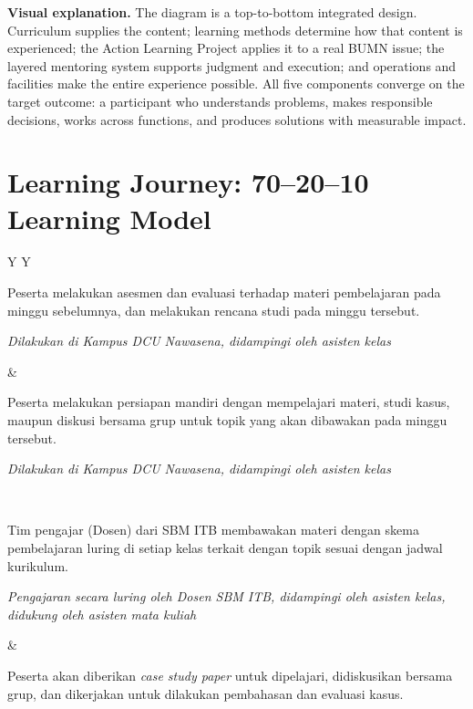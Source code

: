 \documentclass[10pt]{article}
\newcommand{\visualexplanation}[1]{%
  \begin{tcolorbox}[colback=lightgray,colframe=navy!35,boxrule=0.5pt,
    arc=2mm,left=2mm,right=2mm,top=1.5mm,bottom=1.5mm]
  \textbf{Visual explanation.} #1
  \end{tcolorbox}}
\begin{document}
\visualexplanation{The diagram is a top-to-bottom integrated design. Curriculum supplies the content; learning methods determine how that content is experienced; the Action Learning Project applies it to a real BUMN issue; the layered mentoring system supports judgment and execution; and operations and facilities make the entire experience possible. All five components converge on the target outcome: a participant who understands problems, makes responsible decisions, works across functions, and produces solutions with measurable impact.}

\section{Learning Journey: 70--20--10 Learning Model}

\begin{tabularx}{\textwidth}{Y Y}
\begin{tcolorbox}[colback=white,colframe=red!45,title=Weekly Study Plan/Recap,fonttitle=\bfseries]
Peserta melakukan asesmen dan evaluasi terhadap materi pembelajaran pada minggu sebelumnya, dan melakukan rencana studi pada minggu tersebut.

\emph{Dilakukan di Kampus DCU Nawasena, didampingi oleh asisten kelas}
\end{tcolorbox}
&
\begin{tcolorbox}[colback=white,colframe=red!35,title=Pre-Learning,fonttitle=\bfseries]
Peserta melakukan persiapan mandiri dengan mempelajari materi, studi kasus, maupun diskusi bersama grup untuk topik yang akan dibawakan pada minggu tersebut.

\emph{Dilakukan di Kampus DCU Nawasena, didampingi oleh asisten kelas}
\end{tcolorbox}
\\
\begin{tcolorbox}[colback=white,colframe=orange!45,title=Lecturing,fonttitle=\bfseries]
Tim pengajar (Dosen) dari SBM ITB membawakan materi dengan skema pembelajaran luring di setiap kelas terkait dengan topik sesuai dengan jadwal kurikulum.

\emph{Pengajaran secara luring oleh Dosen SBM ITB, didampingi oleh asisten kelas, didukung oleh asisten mata kuliah}
\end{tcolorbox}
&
\begin{tcolorbox}[colback=white,colframe=yellow!70!orange,title=Case Study \& Roleplay,fonttitle=\bfseries]
Peserta akan diberikan \emph{case study paper} untuk dipelajari, didiskusikan bersama grup, dan dikerjakan untuk dilakukan pembahasan dan evaluasi kasus.


\end{tcolorbox}
\end{tabularx}
\end{document}
